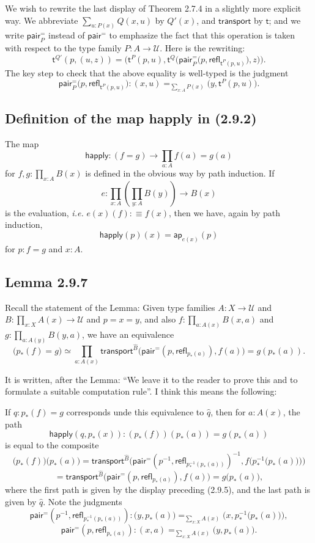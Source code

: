 \documentclass[12pt]{article}
\newcommand{\msf}{\mathsf}
\newcommand{\de}{:\equiv}
\newcommand{\pa}{\mathsf{pair}^=}
\newcommand{\refl}{\mathsf{refl}}
\newcommand{\tr}{\mathsf{transport}}
\newcommand{\U}{\mathcal U}
\begin{document}
We wish to rewrite the last display of Theorem 2.7.4 in a slightly more explicit way. We abbreviate $\sum_{u:P(x)}Q(x,u)$ by $Q'(x)$, and $\tr$ by $\msf t$; and we write $\pa_P$ instead of $\pa$ to emphasize the fact that this operation is taken with respect to the type family $P:A\to\U$. Here is the rewriting:
$$
\msf t^{Q'}(p,(u,z))=\Bigg(\msf t^P(p,u),\msf t^Q\bigg(\pa_P\Big(p,\refl_{\msf t^P(p,u)}\Big),z\bigg)\Bigg).
$$ 
The key step to check that the above equality is well-typed is the judgment 
$$
\pa_P\Big(p,\refl_{\msf t^P(p,u)}\Big):(x,u)=_{\sum_{x:A}P(x)}\big(y,\msf t^P(p,u)\big).
$$ 


\subsection{Definition of the map \textsf{happly} in (2.9.2)}

The map 
$$
\msf{happly}:(f=g)\to\prod_{a:A}f(a)=g(a)
$$ 
for $f,g:\prod_{x:A}B(x)$ is defined in the obvious way by path induction. If 
$$
e:\prod_{x:A}\left(\prod_{y:A}B(y)\right)\to B(x)
$$ 
is the evaluation, \emph{i.e.} $e(x)(f)\de f(x)$, then we have, again by path induction, 
$$
\msf{happly}(p)(x)=\msf{ap}_{e(x)}(p)
$$ 
for $p:f=g$ and $x:A$. 


\subsection{Lemma 2.9.7}

Recall the statement of the Lemma: Given type families $A:X\to\U$ and $B:\prod_{x:X}A(x)\to\U$ and $p=x=y$, and also $f:\prod_{a:A(x)}B(x,a)$ and $g:\prod_{a:A(y)}B(y,a)$, we have an equivalence 
$$
\big(p_*(f)=g\big)\simeq\prod_{a:A(x)}\tr^{\widehat B}\Big(\pa(p,\refl_{p_*(a)}),f(a)\Big)=g(p_*(a)).
$$ 

It is written, after the Lemma: ``We leave it to the reader to prove this and to formulate a suitable computation rule''. I think this means the following:

If $q:p_*(f)=g$ corresponds unde this equivalence to $\widehat q$, then for $a:A(x)$, the path 
$$
\msf{happly}(q,p_*(x)):(p_*(f))(p_*(a))=g(p_*(a))
$$ 
is equal to the composite 
$$
\big(p_*(f)\big)\big(p_*(a)\big)=
\tr^{\widehat B}\bigg(\pa\left(p^{-1},\refl_{p^{-1}_*(p_*(a))}\right)^{-1},f\Big(p^{-1}_*\big(p_*(a)\big)\Big)\bigg)
$$
$$
=\tr^{\widehat B}\Big(\pa\left(p,\refl_{p_*(a)}\right),f(a)\Big)=g\big(p_*(a)\big),
$$ 
where the first path is given by the display preceding (2.9.5), and the last path is given by $\widehat q$. Note the judgments
$$
\pa\left(p^{-1},\refl_{p^{-1}_*(p_*(a))}\right):\big(y,p_*(a)\big)=_{\sum_{x:X}A(x)}\Big(x,p^{-1}_*\big(p_*(a)\big)\Big),
$$ 
$$
\pa\left(p,\refl_{p_*(a)}\right):(x,a)=_{\sum_{x:X}A(x)}\big(y,p_*(a)\big).
$$
\end{document}
